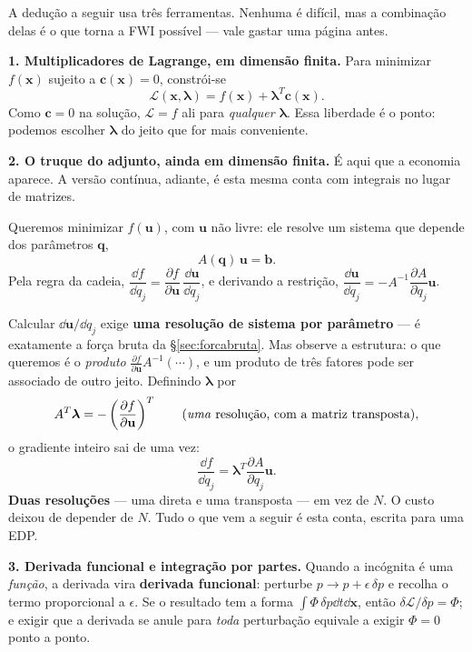 \documentclass[11pt,a4paper,oneside]{report}
\begin{document}
\begin{matematica}
A dedu\c{c}\~ao a seguir usa tr\^es ferramentas. Nenhuma \'e dif\'icil, mas a
combina\c{c}\~ao delas \'e o que torna a FWI poss\'ivel --- vale gastar uma
p\'agina antes.

\medskip
\textbf{1. Multiplicadores de Lagrange, em dimens\~ao finita.}
Para minimizar $f(\mathbf{x})$ sujeito a $\mathbf{c}(\mathbf{x}) = 0$,
constr\'oi-se
\[
\mathcal{L}(\mathbf{x},\boldsymbol{\lambda})
 = f(\mathbf{x}) + \boldsymbol{\lambda}^{T}\mathbf{c}(\mathbf{x}) .
\]
Como $\mathbf{c} = 0$ na solu\c{c}\~ao, $\mathcal{L} = f$ ali para
\emph{qualquer} $\boldsymbol{\lambda}$. Essa liberdade \'e o ponto: podemos
escolher $\boldsymbol{\lambda}$ do jeito que for mais conveniente.

\medskip
\textbf{2. O truque do adjunto, ainda em dimens\~ao finita.} \'E aqui que a
economia aparece. A vers\~ao cont\'inua, adiante, \'e esta mesma conta com
integrais no lugar de matrizes.

Queremos minimizar $f(\mathbf{u})$, com $\mathbf{u}$ n\~ao livre: ele resolve
um sistema que depende dos par\^ametros $\mathbf{q}$,
\[
A(\mathbf{q})\,\mathbf{u} = \mathbf{b}.
\]
Pela regra da cadeia,
$\dfrac{\dd f}{\dd q_j}
 = \dfrac{\partial f}{\partial \mathbf{u}}\,
   \dfrac{\dd\mathbf{u}}{\dd q_j}$,
e derivando a restri\c{c}\~ao,
$\dfrac{\dd\mathbf{u}}{\dd q_j}
 = -A^{-1}\dfrac{\partial A}{\partial q_j}\mathbf{u}$.

Calcular $\dd\mathbf{u}/\dd q_j$ exige \textbf{uma resolu\c{c}\~ao de sistema
por par\^ametro} --- \'e exatamente a for\c{c}a bruta da
§\ref{sec:forcabruta}. Mas observe a estrutura: o que queremos \'e o
\emph{produto} $\frac{\partial f}{\partial\mathbf{u}}A^{-1}(\cdots)$, e um
produto de tr\^es fatores pode ser associado de outro jeito. Definindo
$\boldsymbol{\lambda}$ por
\[
A^{T}\boldsymbol{\lambda}
 = -\left(\frac{\partial f}{\partial\mathbf{u}}\right)^{T}
\qquad\text{(\emph{uma} resolu\c{c}\~ao, com a matriz transposta)},
\]
o gradiente inteiro sai de uma vez:
\[
\frac{\dd f}{\dd q_j}
 = \boldsymbol{\lambda}^{T}\frac{\partial A}{\partial q_j}\mathbf{u} .
\]
\textbf{Duas resolu\c{c}\~oes} --- uma direta e uma transposta --- em vez de
$N$. O custo deixou de depender de $N$. Tudo o que vem a seguir \'e esta
conta, escrita para uma EDP.

\medskip
\textbf{3. Derivada funcional e integra\c{c}\~ao por partes.}
Quando a inc\'ognita \'e uma \emph{fun\c{c}\~ao}, a derivada vira
\textbf{derivada funcional}: perturbe $p \to p + \epsilon\,\delta p$ e recolha
o termo proporcional a $\epsilon$. Se o resultado tem a forma
$\int \Phi\,\delta p \dd t\dd\mathbf{x}$, ent\~ao
$\delta\mathcal{L}/\delta p = \Phi$; e exigir que a derivada se anule para
\emph{toda} perturba\c{c}\~ao equivale a exigir $\Phi = 0$ ponto a ponto.


\end{matematica}
\end{document}
